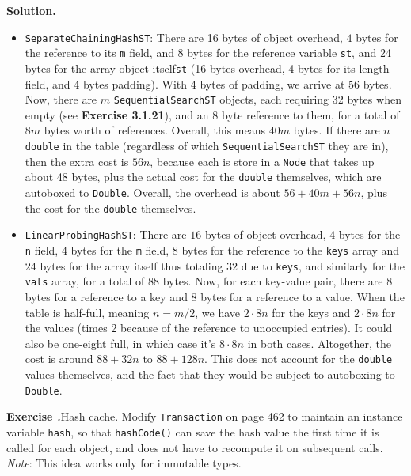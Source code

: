 \documentclass[12pt, a4paper]{article}
\newenvironment{ex}[2][Exercise]
{\par\medskip\noindent \textbf{#1 #2.}}
{\medskip}
\newenvironment{sol}[1][Solution]
{\par\medskip\noindent \textbf{#1.} }
{\medskip}
\begin{document}
	\begin{sol}
		\begin{itemize}
			\item \texttt{SeparateChainingHashST}: There are 16 bytes of object overhead,
			$4$ bytes for the reference to its \texttt{m} field, and 8 bytes for the reference
			variable \texttt{st}, and 24 bytes for the array object itself\texttt{st} (16
			bytes overhead, 4 bytes for its length field, and 4 bytes padding). With
			4 bytes of padding, we arrive at $56$ bytes. Now, there are $m$
			\texttt{SequentialSearchST} objects, each requiring 32 bytes when empty
			(see \textbf{Exercise 3.1.21}), and an $8$ byte reference to them, for
			a total of $8m$ bytes worth of references. Overall, this means $40m$ bytes.
			If there are $n$ \texttt{double} in the table (regardless
			of which \texttt{SequentialSearchST} they are in), then the extra cost is $56n$,
			because each is store in a \texttt{Node} that takes up about 48 bytes,
			plus the actual cost for the \texttt{double} themselves, which are autoboxed
			to \texttt{Double}. Overall, the overhead is about $56+40m + 56n$,
			plus the cost for the \texttt{double} themselves.
			\item \texttt{LinearProbingHashST}: There are $16$ bytes of object overhead,
			$4$ bytes for the \texttt{n} field, $4$ bytes for the \texttt{m} field,
			$8$ bytes for the reference to the \texttt{keys} array and $24$ bytes for the
			array itself thus totaling $32$ due to \texttt{keys}, and similarly for the
			\texttt{vals} array, for a total of $88$ bytes. Now, for each key-value pair,
			there are 8 bytes for a reference to a key and 8 bytes for a reference to a value.
			When the table is half-full, meaning $n=m/2$, we have $2\cdot 8n$ for the keys and
			$2\cdot 8n$ for the values (times 2 because of the reference to unoccupied entries).
			It could also be one-eight full, in which case it's $8\cdot 8n$ in both cases.
			Altogether, the cost is around $88 + 32n$ to $88+128n$. This does not account
			for the \texttt{double} values themselves, and the fact that they would be subject
			to autoboxing to \texttt{Double}.
		\end{itemize}
	\end{sol}
	\begin{ex}{25}
		\emph{Hash cache}. Modify \texttt{Transaction} on page 462 to maintain an instance
		variable \texttt{hash}, so that \texttt{hashCode()} can save the hash value
		the first time it is called for each object, and does not have to recompute it
		on subsequent calls. \emph{Note}: This idea works only for immutable types.
	\end{ex}
\end{document}
